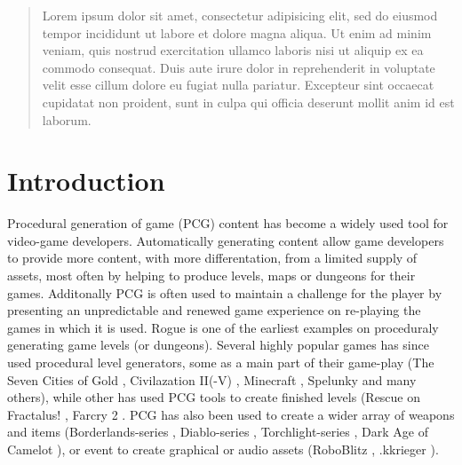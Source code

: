 \documentclass[a4paper,titlepage,final, twoside]{report}
\begin{document}

\setcounter{page}{0}

\begin{spacing}{1.5}
\begin{abstract}
	Lorem ipsum dolor sit amet, consectetur adipisicing elit, sed do eiusmod tempor incididunt ut labore et dolore magna aliqua. Ut enim ad minim veniam, quis nostrud exercitation ullamco laboris nisi ut aliquip ex ea commodo consequat. Duis aute irure dolor in reprehenderit in voluptate velit esse cillum dolore eu fugiat nulla pariatur. Excepteur sint occaecat cupidatat non proident, sunt in culpa qui officia deserunt mollit anim id est laborum.
\end{abstract}
\end{spacing}

\tableofcontents
\newpage


\chapter{Introduction}
Procedural generation of game (PCG) content has become a widely used tool for video-game developers.
Automatically generating content allow game developers to provide more content, with more differentation, from a limited supply of assets, most often by helping to produce levels, maps or dungeons for their games. 
Additonally PCG is often used to maintain a challenge for the player by presenting an unpredictable and renewed game experience on re-playing the games in which it is used.
Rogue \citeyearpar{game:rogue} is one of the earliest examples on proceduraly generating game levels (or dungeons). Several highly popular games has since used procedural level generators, some as a main part of their game-play (The Seven Cities of Gold \citeyearpar{game:sevencities}, Civilazation II(-V) \citeyearpar{game:civilizationii}, Minecraft \citeyearpar{game:minecraft}, Spelunky \citeyearpar{game:spelunky} and many others), while other has used PCG tools to create finished levels (Rescue on Fractalus! \citeyearpar{game:rescurefractalus}, Farcry 2 \citeyearpar{game:farcry}.
PCG has also been used to create a wider array of weapons and items (Borderlands-series \citeyearpar{game:borderlandsseries}, Diablo-series \citeyearpar{game:diabloseries}, Torchlight-series \citeyearpar{game:diabloseries}, Dark Age of Camelot \citeyearpar{game:darkage}), or event to create graphical or audio assets (RoboBlitz \citeyearpar{game:RoboBlitz},  .kkrieger \citeyearpar{game:kkrieger}).
\end{document}

